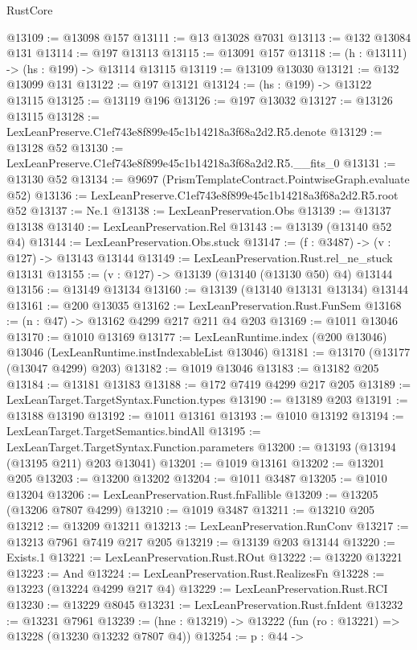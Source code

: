 \begin{lexlean}{RustCore}
\begin{coremodule}
@13109 := @13098 @157
@13111 := @13 @13028 @7031
@13113 := @132 @13084 @131
@13114 := @197 @13113
@13115 := @13091 @157
@13118 := (h : @13111) -> (hs : @199) -> @13114 @13115
@13119 := @13109 @13030
@13121 := @132 @13099 @131
@13122 := @197 @13121
@13124 := (hs : @199) -> @13122 @13115
@13125 := @13119 @196
@13126 := @197 @13032
@13127 := @13126 @13115
@13128 := LexLeanPreserve.C1ef743e8f899e45c1b14218a3f68a2d2.R5.denote
@13129 := @13128 @52
@13130 := LexLeanPreserve.C1ef743e8f899e45c1b14218a3f68a2d2.R5.__fits_0
@13131 := @13130 @52
@13134 := @9697 (PrismTemplateContract.PointwiseGraph.evaluate @52)
@13136 := LexLeanPreserve.C1ef743e8f899e45c1b14218a3f68a2d2.R5.root @52
@13137 := Ne.{1}
@13138 := LexLeanPreservation.Obs
@13139 := @13137 @13138
@13140 := LexLeanPreservation.Rel
@13143 := @13139 (@13140 @52 @4)
@13144 := LexLeanPreservation.Obs.stuck
@13147 := (f : @3487) -> (v : @127) -> @13143 @13144
@13149 := LexLeanPreservation.Rust.rel_ne_stuck @13131
@13155 := (v : @127) -> @13139 (@13140 (@13130 @50) @4) @13144
@13156 := @13149 @13134
@13160 := @13139 (@13140 @13131 @13134) @13144
@13161 := @200 @13035
@13162 := LexLeanPreservation.Rust.FunSem
@13168 := (n : @47) -> @13162 @4299 @217 @211 @4 @203
@13169 := @1011 @13046
@13170 := @1010 @13169
@13177 := LexLeanRuntime.index (@200 @13046) @13046 (LexLeanRuntime.instIndexableList @13046)
@13181 := @13170 (@13177 (@13047 @4299) @203)
@13182 := @1019 @13046
@13183 := @13182 @205
@13184 := @13181 @13183
@13188 := @172 @7419 @4299 @217 @205
@13189 := LexLeanTarget.TargetSyntax.Function.types
@13190 := @13189 @203
@13191 := @13188 @13190
@13192 := @1011 @13161
@13193 := @1010 @13192
@13194 := LexLeanTarget.TargetSemantics.bindAll
@13195 := LexLeanTarget.TargetSyntax.Function.parameters
@13200 := @13193 (@13194 (@13195 @211) @203 @13041)
@13201 := @1019 @13161
@13202 := @13201 @205
@13203 := @13200 @13202
@13204 := @1011 @3487
@13205 := @1010 @13204
@13206 := LexLeanPreservation.Rust.fnFallible
@13209 := @13205 (@13206 @7807 @4299)
@13210 := @1019 @3487
@13211 := @13210 @205
@13212 := @13209 @13211
@13213 := LexLeanPreservation.RunConv
@13217 := @13213 @7961 @7419 @217 @205
@13219 := @13139 @203 @13144
@13220 := Exists.{1}
@13221 := LexLeanPreservation.Rust.ROut
@13222 := @13220 @13221
@13223 := And
@13224 := LexLeanPreservation.Rust.RealizesFn
@13228 := @13223 (@13224 @4299 @217 @4)
@13229 := LexLeanPreservation.Rust.RCI
@13230 := @13229 @8045
@13231 := LexLeanPreservation.Rust.fnIdent
@13232 := @13231 @7961
@13239 := (hne : @13219) -> @13222 (fun (ro : @13221) => @13228 (@13230 @13232 @7807 @4))
@13254 := {p : @44} ->

\end{coremodule}
\end{lexlean}
